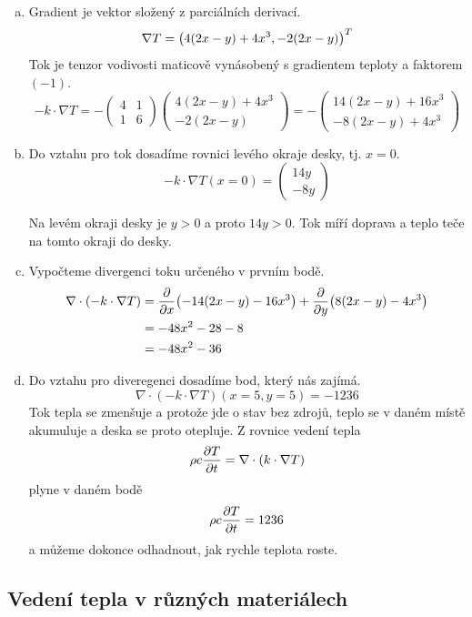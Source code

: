 \reseni
\begin{enumerate}[a)]
\item Gradient je vektor složený z parciálních derivací. $$\nabla T=\qty(
  4(2x-y)+4x^3,-2(2x-y))^T$$ Tok je tenzor vodivosti maticově vynásobený s gradientem teploty a faktorem $(-1)$.
  $$-k\cdot \nabla T=-
  \begin{pmatrix}
    4&1\\1&6
  \end{pmatrix}
  \begin{pmatrix}
    4(2x-y)+4x^3\\-2(2x-y)
  \end{pmatrix}
  =-
  \begin{pmatrix}
    14(2x- y)+16x^3\\-8(2x- y)+4x^3
  \end{pmatrix}
$$
\item Do vztahu pro tok dosadíme rovnici levého okraje desky, tj. $x=0$.
  $$-k\cdot \nabla T (x=0)=
  \begin{pmatrix}
    14y\\-8y
  \end{pmatrix}
  $$
  
  Na levém okraji desky je $y>0$ a proto $14y>0$. Tok míří doprava a teplo teče na tomto okraji do desky.
\item  Vypočteme divergenci toku určeného v prvním bodě. $$
  \begin{aligned}
\nabla \cdot (-k\cdot \nabla T )&=\pdv{x}(-14(2x- y)-16x^3)+\pdv{y}(8(2x- y)-4x^3)\\&=-48x^2-28-8\\&=-48x^2-36
\end{aligned}
$$
\item Do vztahu pro diveregenci dosadíme bod, který nás zajímá. $$\nabla \cdot (-k\cdot \nabla T )(x=5,y=5)=-1236$$ Tok tepla se zmenšuje a protože jde o stav bez zdrojů, teplo se v daném místě akumuluje a deska se proto otepluje. Z rovnice vedení tepla
  $$\rho c\pdv{T}{t}=\nabla\cdot(k \cdot \nabla T)$$
  plyne v daném bodě
  $$\rho c\pdv{T}{t}=1236$$
  a můžeme dokonce odhadnout, jak rychle teplota roste.
\end{enumerate}
\konec


\subsection{Vedení tepla v různých materiálech}


